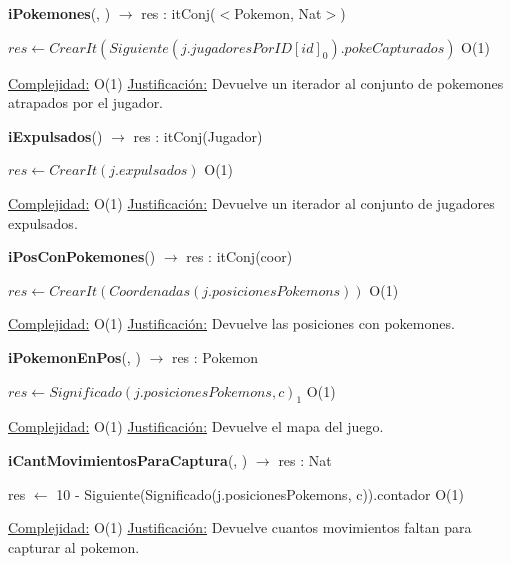 \begin{algorithm}[H]{\textbf{iPokemones}(, ) $\to$ res : itConj($<$Pokemon, Nat$>$)} 
	{}
	\begin{algorithmic}
		\State $res \gets CrearIt(Siguiente(j.jugadoresPorID[id]_0).pokeCapturados) $ \Comment O(1)
	
		\medskip
		\Statex \underline{Complejidad:} O(1)
		\Statex \underline{Justificación:} Devuelve un iterador al conjunto de pokemones atrapados por el jugador.
    \end{algorithmic}
\end{algorithm}

\begin{algorithm}[H]{\textbf{iExpulsados}() $\to$ res : itConj(Jugador)} 
	{}
	\begin{algorithmic}
		\State $res \gets CrearIt(j.expulsados) $ \Comment O(1)
	
		\medskip
		\Statex \underline{Complejidad:} O(1)
		\Statex \underline{Justificación:} Devuelve un iterador al conjunto de jugadores expulsados.
    \end{algorithmic}
\end{algorithm}

\begin{algorithm}[H]{\textbf{iPosConPokemones}() $\to$ res : itConj(coor)} 
	{}
	\begin{algorithmic}
		\State $res \gets CrearIt(Coordenadas(j.posicionesPokemons)) $ \Comment O(1)
	
		\medskip
		\Statex \underline{Complejidad:} O(1)
		\Statex \underline{Justificación:} Devuelve las posiciones con pokemones.
    \end{algorithmic}
\end{algorithm}

\begin{algorithm}[H]{\textbf{iPokemonEnPos}(, ) $\to$ res : Pokemon} 
	{}
	\begin{algorithmic}
		\State $res \gets Significado(j.posicionesPokemons, c)_{1} $ \Comment O(1)
	
		\medskip
		\Statex \underline{Complejidad:} O(1)
		\Statex \underline{Justificación:} Devuelve el mapa del juego.
    \end{algorithmic}
\end{algorithm}

\begin{algorithm}[H]{\textbf{iCantMovimientosParaCaptura}(, ) $\to$ res : Nat} 
	{}
	\begin{algorithmic}
		\State res $\gets$ 10 - Siguiente(Significado(j.posicionesPokemons, c)).contador  \Comment O(1)
	
		\medskip
		\Statex \underline{Complejidad:} O(1)
		\Statex \underline{Justificación:} Devuelve cuantos movimientos faltan para capturar al pokemon.
    \end{algorithmic}
\end{algorithm}

